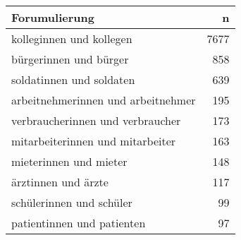 
\begin{tabular}{lr}
\toprule
Forumulierung & n\\
\midrule
kolleginnen und kollegen & 7677\\
bürgerinnen und bürger & 858\\
soldatinnen und soldaten & 639\\
arbeitnehmerinnen und arbeitnehmer & 195\\
verbraucherinnen und verbraucher & 173\\
mitarbeiterinnen und mitarbeiter & 163\\
mieterinnen und mieter & 148\\
ärztinnen und ärzte & 117\\
schülerinnen und schüler & 99\\
patientinnen und patienten & 97\\
\bottomrule
\end{tabular}